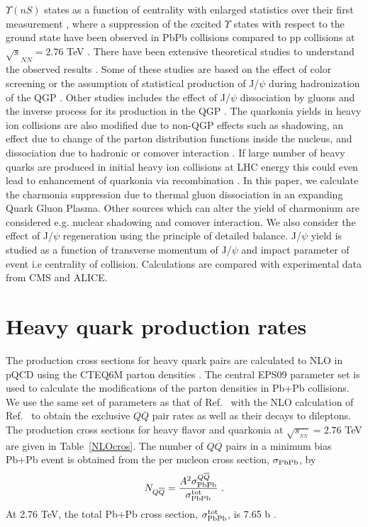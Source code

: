 \documentclass[aps,prc,preprint,superscriptaddress,showpacs,showkeys]{revtex4-1}
\begin{document}
$\Upsilon(nS)$ states as a function of centrality \cite{CMSUpsilon} with enlarged statistics
over their first measurement \cite{UCMS}, where a suppression of the excited $\Upsilon$ states with respect 
to the ground state have been observed in PbPb collisions compared to pp collisions at $\sqrt s_{NN} = 2.76$ TeV \cite{YSuppAbdShuk}.
There have been extensive theoretical studies to understand the observed results \cite{SATZ,Xu,Thews,Andronic_SH1,Andronic_SH2,YSuppAbdShuk}. 
Some of these studies are based on the effect of color screening \cite{SATZ,YSuppAbdShuk} or the assumption of statistical production of J/$\psi$ 
during hadronization of the QGP \cite{Andronic_SH1,Andronic_SH2}. Other studies includes the effect of J/$\psi$ dissociation by gluons 
and the inverse process for its production in the QGP \cite{Grandchamp,Thews}.  
The quarkonia yields in heavy ion collisions are also modified due to non-QGP effects such as
shadowing, an effect due to change of the parton distribution functions inside the nucleus,
and dissociation due to hadronic or comover interaction \cite{Vogt}.
 If large number of heavy quarks are produced in initial heavy ion collisions at LHC energy 
this could even lead to enhancement of quarkonia via recombination \cite{Andronic_SH1, Andronic_SH2, Rapp1, Rapp2}. 
 In this paper, we calculate the charmonia suppression due to thermal gluon dissociation in an expanding
Quark Gluon Plasma. Other sources which can alter the yield of charmonium are considered 
e.g. nuclear shadowing and comover interaction. We also consider the effect of J/$\psi$ regeneration using the principle of
detailed balance. J/$\psi$ yield is studied as a function of transverse momentum of J/$\psi$ and impact parameter of event i.e 
centrality of collision. Calculations are compared with experimental data from CMS and ALICE.

\section{Heavy quark production rates}
The production cross sections for heavy quark pairs are calculated to NLO in pQCD  
using the CTEQ6M parton densities \cite{CTEQ6}.  The central EPS09 parameter set 
\cite{EPS09} is used to calculate the modifications of the parton densities in 
Pb+Pb collisions.  We use the same set of parameters
as that of Ref.~\cite{CNV} with the NLO calculation of Ref.~\cite{MNR}
to obtain the exclusive $Q \overline Q$ pair rates as well as their decays
to dileptons.  
 The production cross sections for heavy flavor and quarkonia at $\sqrt{s_{_{NN}}}= 2.76$ 
TeV \cite{ContinuumVKShuk} are given in Table~\ref{NLOcros}.  The number of $Q \overline Q$ pairs
in a minimum bias Pb+Pb event is obtained from the per nucleon cross
section, $\sigma_{\rm PbPb}$, by
\begin{eqnarray}
N_{Q \overline Q} = {A^2 \sigma_{\rm PbPb}^{Q \overline Q}  \over  
\sigma_{\rm PbPb}^{\rm tot}} \, \, .
\end{eqnarray}
 At 2.76 TeV, the total Pb+Pb cross section, $\sigma_{\rm PbPb}^{\rm tot}$, 
is 7.65 b \cite{PbPbTotal}.
\end{document}
